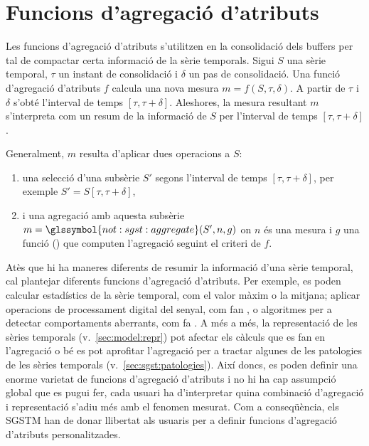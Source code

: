 
\section{Funcions d'agregació d'atributs}
\label{sec:model:interpolador}
\label{sec:model:agregador}


Les funcions d'agregació d'atributs s'utilitzen en la consolidació
dels buffers per tal de compactar certa informació de la sèrie
temporals. Sigui $S$ una sèrie temporal, $\tau$ un instant de
consolidació i $\delta$ un pas de consolidació. Una funció d'agregació
d'atributs $f$ calcula una nova mesura $m=f(S,\tau,\delta)$. A partir
de $\tau$ i $\delta$ s'obté l'interval de temps $[\tau,
\tau+\delta]$. Aleshores, la mesura resultant $m$ s'interpreta com un
resum de la informació de $S$ per l'interval de temps $[\tau,
\tau+\delta]$.


Generalment, $m$ resulta d'aplicar dues operacions a $S$: 
\begin{enumerate}
\item una selecció d'una subsèrie $S'$ segons l'interval de temps
  $[\tau, \tau+\delta]$, per exemple $S' = S[\tau, \tau+\delta]$,
\item i una agregació amb aquesta subsèrie $m  =
  \glssymbol{not:sgst:aggregate}(S',n,g)$ on
  $n$ és una mesura i $g$ una funció () 
  que computen l'agregació seguint el criteri de $f$.
\end{enumerate}



Atès que hi ha maneres diferents de resumir la informació d'una sèrie
temporal, cal plantejar diferents funcions d'agregació d'atributs. Per
exemple, es poden calcular estadístics de la sèrie temporal, com el
valor màxim o la mitjana; aplicar operacions de processament digital
del senyal, com fan \textcite{zhang11}, o algoritmes per a detectar
comportaments aberrants, com fa \textcite{lisa00:brutlag}. A més a
més, la representació de les sèries temporals
(v.~\autoref{sec:model:repr}) pot afectar els càlculs que es fan en
l'agregació o bé es pot aprofitar l'agregació per a tractar algunes de
les patologies de les sèries temporals
(v.~\autoref{sec:sgst:patologies}).  Així doncs, es poden definir una
enorme varietat de funcions d'agregació d'atributs i no hi ha cap
assumpció global que es pugui fer, cada usuari ha d'interpretar quina
combinació d'agregació i representació s'adiu més amb el fenomen
mesurat. Com a conseqüència, els \gls{SGSTM} han de donar llibertat
als usuaris per a definir funcions d'agregació d'atributs
personalitzades.


